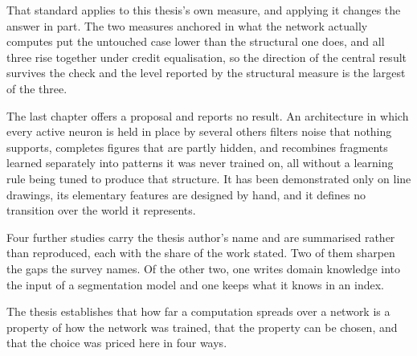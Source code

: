 That standard applies to this thesis's own measure, and applying it changes
the answer in part. The two measures anchored in what the network
actually computes put the untouched case lower than the structural one does,
and all three rise together under credit equalisation, so the direction of the central result
survives the check and the level reported by the structural measure is the
largest of the three.

The last chapter offers a proposal and reports no result. An architecture in which
every active neuron is held in place by several others filters noise that
nothing supports, completes figures that are partly hidden, and recombines
fragments learned separately into patterns it was never trained on, all
without a learning rule being tuned to produce that structure. It has been
demonstrated only on line drawings, its elementary features are designed by
hand, and it defines no transition over the world it represents.

Four further studies carry the thesis author's name and are summarised rather
than reproduced, each with the share of the work stated. Two of them sharpen
the gaps the survey names. Of the other two, one writes domain knowledge into
the input of a segmentation model and one keeps what it knows in an index.

The thesis establishes that how far a computation spreads over a network is a
property of how the network was trained, that the property can be chosen, and
that the choice was priced here in four ways.
